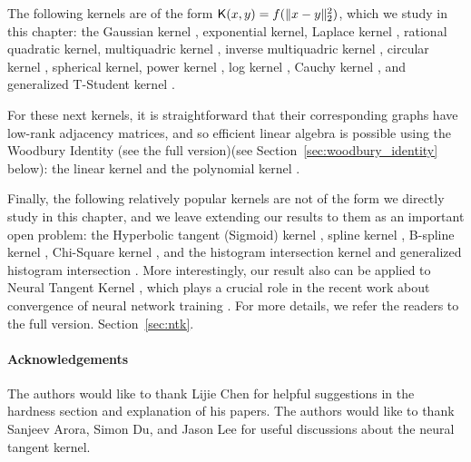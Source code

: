 The following kernels are of the form $\mathsf{K}(x,y) = f(\|x-y\|_2^2)$, which
we study in this chapter: the Gaussian kernel \cite{njw02,rr08}, exponential kernel, Laplace kernel \cite{rr08}, rational quadratic kernel, multiquadric kernel \cite{bg97}, inverse multiquadric kernel \cite{m84,m12}, circular kernel \cite{btfb05}, spherical kernel, power kernel \cite{fs03}, log kernel \cite{bg97,m12}, Cauchy kernel \cite{rr08}, and generalized T-Student kernel \cite{btf04}.

For these next kernels, it is straightforward that their corresponding graphs have low-rank adjacency matrices, and so efficient linear algebra is possible using the Woodbury Identity \ifdefined\isfocs(see the full version)\else(see Section~\ref{sec:woodbury_identity} below)\fi: the linear kernel \cite{ssa98,mssmsr99,h07,s14} and the polynomial kernel \cite{cv95,ge08,bossr08,chcrl10}.

Finally, the following relatively popular kernels are not of the form we
directly study in this chapter, and we leave extending our results to them as an important open problem: the Hyperbolic tangent (Sigmoid) kernel \cite{hs97,btb05,jkl09,ksh12,zsjbd17,zsd17,ssbcv17,zsjd19}, spline kernel \cite{g98,u99}, B-spline kernel \cite{h04,m10}, Chi-Square kernel \cite{vz12}, and the histogram intersection kernel and generalized histogram intersection \cite{btb05a}. More interestingly, our result also can be applied to Neural Tangent Kernel \cite{jgh18}, which plays a crucial role in the recent work about convergence of neural network training \cite{ll18,dzps19,als18,als19,sy19,bpsw20,lsswy20,jmsz20}. For more details, we refer the readers to
\ifdefined\isfocs
the full version.
\else
Section~\ref{sec:ntk}.
\fi

\paragraph{Acknowledgements}

The authors would like to thank Lijie Chen for helpful suggestions in the hardness section and explanation of his papers. The authors would like to thank Sanjeev Arora, Simon Du, and Jason Lee for useful discussions about the neural tangent kernel.

